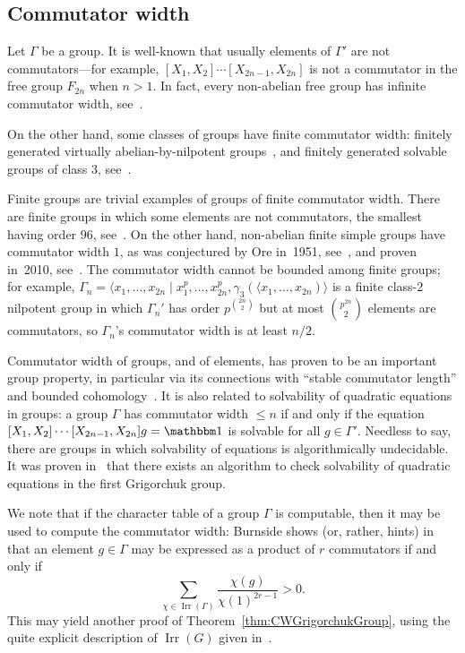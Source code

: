 \documentclass[a4paper,11pt]{amsart}
\begin{document}
\subsection{Commutator width}
Let $\Gamma$ be a group. It is well-known that usually elements of
$\Gamma'$ are not commutators---for example,
$[X_1,X_2]\cdots[X_{2n-1},X_{2n}]$ is not a commutator in the free
group $F_{2n}$ when $n>1$. In fact, every non-abelian free group has
infinite commutator width, see~\cite{Rhemtulla:CommutatorsF2}.

On the other hand, some classes of groups have finite commutator
width: finitely generated virtually abelian-by-nilpotent
groups~\cite{Segal:Words}, and finitely generated solvable groups of
class $3$, see~\cite{Rhemtulla:Commutators}.

Finite groups are trivial examples of groups of finite commutator
width.  There are finite groups in which some elements are not
commutators, the smallest having order $96$,
see~\cite{Guralnick:Group96}. On the other hand, non-abelian finite
simple groups have commutator width $1$, as was conjectured by Ore
in~1951, see~\cite{Ore:Commutators}, and proven in~2010,
see~\cite{Liebeck:OreConjecture}. The commutator width cannot be
bounded among finite groups; for example,
$\Gamma_n=\langle x_1,\dots,x_{2n}\mid
x_1^p,\dots,x_{2n}^p,\gamma_3(\langle x_1,\dots,x_{2n})\rangle$ is a
finite class-$2$ nilpotent group in which $\Gamma_n'$ has order
$p^{\binom{2n}2}$ but at most $\binom{p^{2n}}2$ elements are
commutators, so $\Gamma_n$'s commutator width is at least $n/2$.

Commutator width of groups, and of elements, has proven to be an
important group property, in particular via its connections with
``stable commutator length'' and bounded
cohomology~\cite{Calegari:SCL}. It is also related to solvability of
quadratic equations in groups: a group $\Gamma$ has commutator width
$\le n$ if and only if the equation
$[X_1,X_2]\cdots[X_{2n-1},X_{2n}]g=\id$ is solvable for all
$g\in\Gamma'$. Needless to say, there are groups in which solvability
of equations is algorithmically undecidable. It was proven
in~\cite{Lysenok-Miasnikov-Ushakov:QuadraticEquationsInGrig} that 
there exists an algorithm to check solvability of quadratic equations  in the first Grigorchuk group.

We note that if the character table of a group $\Gamma$ is computable,
then it may be used to compute the commutator width: Burnside shows
(or, rather, hints) in~\cite[\S238, Ex. 7]{Burnside:Groups} that an
element $g\in\Gamma$ may be expressed as a product of $r$ commutators
if and only if
\[\sum_{\chi\in\operatorname{Irr}(\Gamma)}\frac{\chi(g)}{\chi(1)^{2r-1}}>0.
\label{eq:BurnsideFormula} \]
This may yield another proof of Theorem~\ref{thm:CWGrigorchukGroup},
using the quite explicit description of $\operatorname{Irr}(G)$ given
in~\cite{Bartholdi:RepresentationZetaFunctions}.
\end{document}
